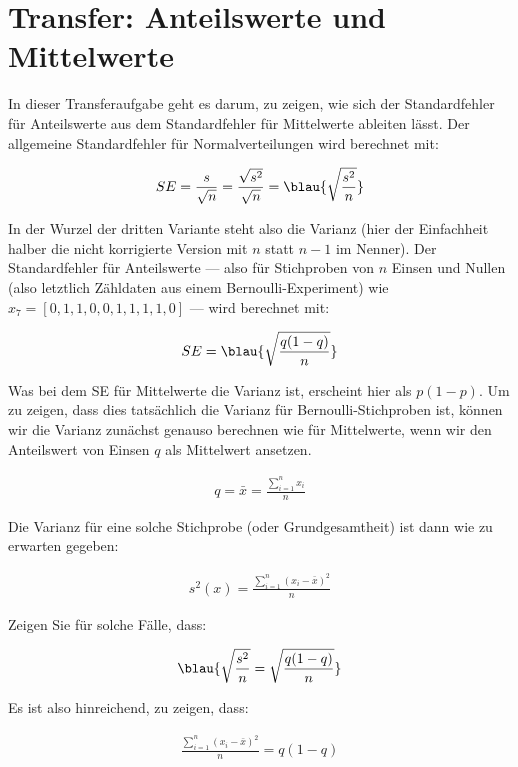 \section{Transfer: Anteilswerte und Mittelwerte}

In dieser Transferaufgabe geht es darum, zu zeigen, wie sich der Standardfehler für Anteilswerte aus dem Standardfehler für Mittelwerte ableiten lässt.
Der allgemeine Standardfehler für Normalverteilungen wird berechnet mit:

\begin{align}
  SE=\frac{s}{\sqrt{n}}=\frac{\sqrt{s^2}}{\sqrt{n}}=\blau{\sqrt{\frac{s^2}{n}}}
\end{align}

In der Wurzel der dritten Variante steht also die Varianz (hier der Einfachheit halber die nicht korrigierte Version mit $n$ statt $n-1$ im Nenner).
Der Standardfehler für Anteilswerte --- also für Stichproben von $n$ Einsen und Nullen (also letztlich Zähldaten aus einem Bernoulli-Experiment) wie $x_7=[0,1,1,0,0,1,1,1,1,0]$ --- wird berechnet mit:

\begin{align}
  SE=\blau{\sqrt{\frac{q(1-q)}{n}}}
\end{align}

Was bei dem SE für Mittelwerte die Varianz ist, erscheint hier als $p(1-p)$.
Um zu zeigen, dass dies tatsächlich die Varianz für Bernoulli-Stichproben ist, können wir die Varianz zunächst genauso berechnen wie für Mittelwerte, wenn wir den Anteilswert von Einsen $q$ als Mittelwert ansetzen.

\begin{align}
  q=\bar{x}=\frac{\sum\limits_{i=1}^{n}x_i}{n}
\end{align}

Die Varianz für eine solche Stichprobe (oder Grundgesamtheit) ist dann wie zu erwarten gegeben:

\begin{align}
  s^2(x)=\frac{\sum\limits_{i=1}^{n}(x_i-\bar{x})^2}{n}
\end{align}

Zeigen Sie für solche Fälle, dass:

\begin{align}
  \blau{\sqrt{\frac{s^2}{n}}=\sqrt{\frac{q(1-q)}{n}}}
\end{align}

Es ist also hinreichend, zu zeigen, dass:

\begin{align}
  \frac{\sum\limits_{i=1}^{n}(x_i-\bar{x})^2}{n}=q(1-q)
\end{align}

